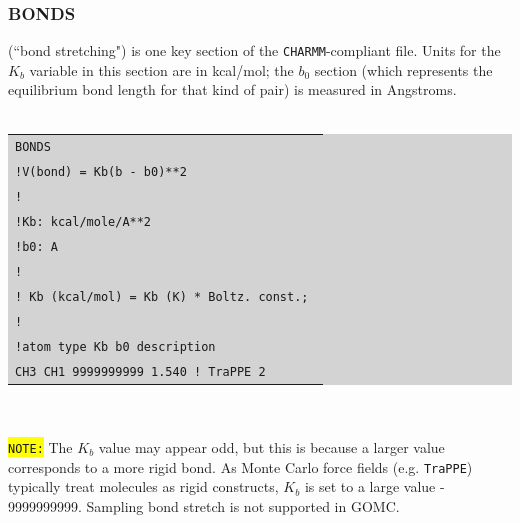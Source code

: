 \subsubsection{BONDS}
(``bond stretching") is one key section of the \texttt{CHARMM}-compliant file. Units for the \texttt{$K_b$} variable in this section are in kcal/mol; the \texttt{$b_0$} section (which represents the equilibrium bond length for that kind of pair) is measured in Angstroms.\\\\
\colorbox{lightgray}{
\begin{tabular}{l}
\texttt{BONDS}\\
\texttt{!V(bond) = Kb(b - b0)**2}\\
\texttt{!}\\
\texttt{!Kb: kcal/mole/A**2}\\
\texttt{!b0: A}\\
\texttt{!}\\
\texttt{! Kb (kcal/mol) = Kb (K) * Boltz. const.; }\\
\texttt{!}\\
\texttt{!atom type     Kb              b0        description}\\
\texttt{CH3 CH1        9999999999      1.540   ! TraPPE 2}\\
\end{tabular}}\\\\
\colorbox{yellow}{\texttt{NOTE:}} The \texttt{$K_b$} value may appear odd, but this is because a larger value corresponds to a more rigid bond. As Monte Carlo force fields (e.g. \texttt{TraPPE}) typically treat molecules as rigid constructs, \texttt{$K_b$} is set to a large value - 9999999999. Sampling bond stretch is not supported in GOMC.\\\\
